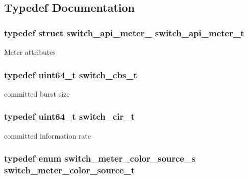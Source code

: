 \subsection{Typedef Documentation}
\hypertarget{group__Meters_ga39b6cf8a3c569d2feee8e369fbc90bb4}{
\subsubsection[{switch\+\_\+api\+\_\+meter\+\_\+t}]{\setlength{\rightskip}{0pt plus 5cm}typedef struct {\bf switch\+\_\+api\+\_\+meter\+\_\+}  {\bf switch\+\_\+api\+\_\+meter\+\_\+t}}}\label{group__Meters_ga39b6cf8a3c569d2feee8e369fbc90bb4}
Meter attributes \hypertarget{group__Meters_ga244ef2ce05d89f779a221e79f1550c84}{
\subsubsection[{switch\+\_\+cbs\+\_\+t}]{\setlength{\rightskip}{0pt plus 5cm}typedef uint64\+\_\+t {\bf switch\+\_\+cbs\+\_\+t}}}\label{group__Meters_ga244ef2ce05d89f779a221e79f1550c84}
committed burst size \hypertarget{group__Meters_gaec2972cd53996da2a473dd74a55f4357}{
\subsubsection[{switch\+\_\+cir\+\_\+t}]{\setlength{\rightskip}{0pt plus 5cm}typedef uint64\+\_\+t {\bf switch\+\_\+cir\+\_\+t}}}\label{group__Meters_gaec2972cd53996da2a473dd74a55f4357}
committed information rate \hypertarget{group__Meters_ga5406e13de6b3be14a1ec8dd74ede4c55}{
\subsubsection[{switch\+\_\+meter\+\_\+color\+\_\+source\+\_\+t}]{\setlength{\rightskip}{0pt plus 5cm}typedef enum {\bf switch\+\_\+meter\+\_\+color\+\_\+source\+\_\+s}  {\bf switch\+\_\+meter\+\_\+color\+\_\+source\+\_\+t}}}\label{group__Meters_ga5406e13de6b3be14a1ec8dd74ede4c55}
